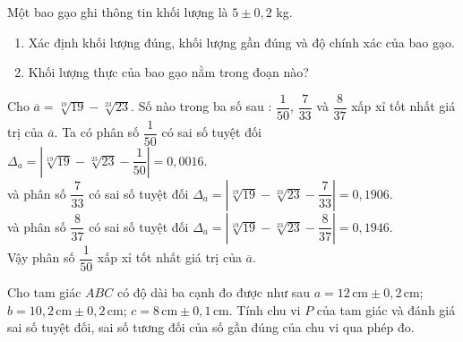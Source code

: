 \begin{bt}%
	Một bao gạo ghi thông tin khối lượng là $ 5\pm 0{,}2 $ kg.
	\begin{enumerate}
		\item Xác định khối lượng đúng, khối lượng gần đúng và độ chính xác của bao gạo.
		\item Khối lượng thực của bao gạo nằm trong đoạn nào?
	\end{enumerate}
\end{bt}

\begin{bt}%
	Cho $\overline{a}=\sqrt[19]{19}-\sqrt[23]{23}$. Số nào trong ba số sau : $ \dfrac{1}{50} $, $ \dfrac{7}{33} $ và $ \dfrac{8}{37} $ xấp xỉ tốt nhất giá trị của  $\overline{a}$.
	\loigiai
	{
		Ta có phân số $ \dfrac{1}{50} $ có sai số tuyệt đối $ \Delta_a=\left|\sqrt[19]{19}-\sqrt[23]{23}-\dfrac{1}{50}\right| =0{,}0016 $.\\
		và phân số $ \dfrac{7}{33} $ có sai số tuyệt đối $ \Delta_a=\left|\sqrt[19]{19}-\sqrt[23]{23}-\dfrac{7}{33}\right| =0{,}1906 $.\\
		và phân số $ \dfrac{8}{37} $ có sai số tuyệt đối $ \Delta_a=\left|\sqrt[19]{19}-\sqrt[23]{23}-\dfrac{8}{37}\right| =0{,}1946 $.\\
		Vậy phân số $ \dfrac{1}{50} $ xấp xỉ tốt nhất giá trị của $\overline{a}$.
	}
\end{bt}

\begin{bt}%
	Cho tam giác $ABC$ có độ dài ba cạnh đo được như sau $a=12\,\text{cm}\pm 0{,}2\,\text{cm}$; $b=10{,}2\,\text{cm}\pm 0{,}2\,\text{cm}$; $c=8\,\text{cm}\pm 0{,}1\,\text{cm}$. Tính chu vi $P$ của tam giác và đánh giá sai số tuyệt đối, sai số tương đối của số gần đúng của chu vi qua phép đo.
\end{bt}

